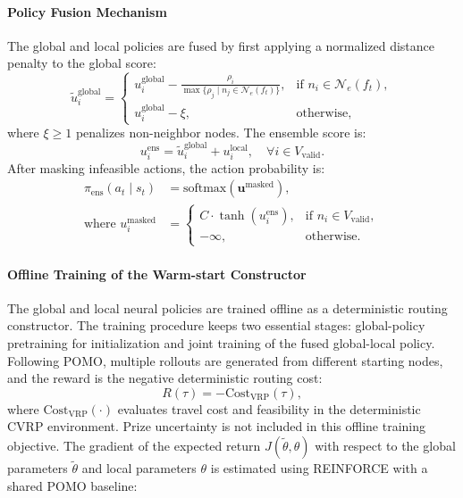\documentclass[preprint,12pt,authoryear]{elsarticle}
\theoremstyle{definition}
\begin{document}
\paragraph{Policy Fusion Mechanism}
The global and local policies are fused by first applying a normalized distance penalty to the global score:
\begin{equation}
\tilde{u}_i^{\text{global}} = \begin{cases}
u_i^{\text{global}} - \frac{\rho_i}{\max\{\rho_j \mid n_j \in \mathcal{N}_e(f_t)\}}, & \text{if } n_i \in \mathcal{N}_e(f_t), \\
u_i^{\text{global}} - \xi, & \text{otherwise},
\end{cases}
\end{equation}
where $\xi \geq 1$ penalizes non-neighbor nodes. The ensemble score is:
\begin{equation}
u_i^{\text{ens}} = \tilde{u}_i^{\text{global}} + u_i^{\text{local}}, \quad \forall i \in V_{\text{valid}}.
\end{equation}
After masking infeasible actions, the action probability is:
\begin{align}
\pi_{\text{ens}}(a_t \mid s_t) &= \text{softmax}(\mathbf{u}^{\text{masked}}), \\
\text{where } u_i^{\text{masked}} &= \begin{cases}
C \cdot \tanh(u_i^{\text{ens}}), & \text{if } n_i \in V_{\text{valid}}, \\
-\infty, & \text{otherwise}.
\end{cases}
\end{align}

\paragraph{Offline Training of the Warm-start Constructor}
The global and local neural policies are trained offline as a deterministic routing constructor. The training procedure keeps two essential stages: global-policy pretraining for initialization and joint training of the fused global-local policy. Following POMO, multiple rollouts are generated from different starting nodes, and the reward is the negative deterministic routing cost:
\begin{equation}
R(\tau) = -\text{Cost}_{\mathrm{VRP}}(\tau),
\end{equation}
where $\text{Cost}_{\mathrm{VRP}}(\cdot)$ evaluates travel cost and feasibility in the deterministic CVRP environment. Prize uncertainty is not included in this offline training objective. The gradient of the expected return $J(\tilde{\theta}, \theta)$ with respect to the global parameters $\tilde{\theta}$ and local parameters $\theta$ is estimated using REINFORCE with a shared POMO baseline:
\end{document}
